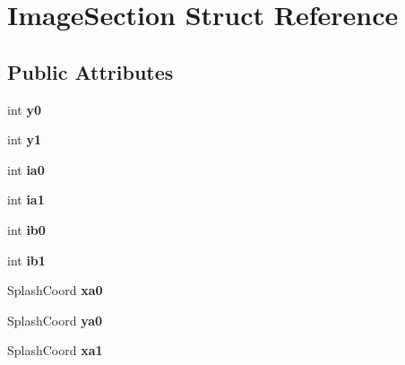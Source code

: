 \hypertarget{struct_image_section}{}\section{Image\+Section Struct Reference}
\label{struct_image_section}
\subsection*{Public Attributes}
\begin{DoxyCompactItemize}
\item 
\mbox{\label{struct_image_section_aa7bc3d19202ed09a562c99115d01532e}} 
int {\bfseries y0}
\item 
\mbox{\label{struct_image_section_a95e3fe6e30c74ce4ceb62021a9b07bea}} 
int {\bfseries y1}
\item 
\mbox{\label{struct_image_section_a96d706a5b6abad3b1443be0653879acf}} 
int {\bfseries ia0}
\item 
\mbox{\label{struct_image_section_a6405fce380eabaa8b312328ba901e623}} 
int {\bfseries ia1}
\item 
\mbox{\label{struct_image_section_af687c5768ff9673acc2fb7c5b3791f0d}} 
int {\bfseries ib0}
\item 
\mbox{\label{struct_image_section_a082da5d891e85d0614024617215587ac}} 
int {\bfseries ib1}
\item 
\mbox{\label{struct_image_section_a33842be2825236f944fb1a9a9d6eaef7}} 
Splash\+Coord {\bfseries xa0}
\item 
\mbox{\label{struct_image_section_a6df8e80ecb6b3eee73ca2cb700aa38f6}} 
Splash\+Coord {\bfseries ya0}
\item 
\mbox{\label{struct_image_section_ab064ac46de519161bb9ecbd63c9b2d89}} 
Splash\+Coord {\bfseries xa1}
\item 
\mbox{\label{struct_image_section_aac3780992f33f8cf4a3d321546d806db}} 

\end{DoxyCompactItemize}
